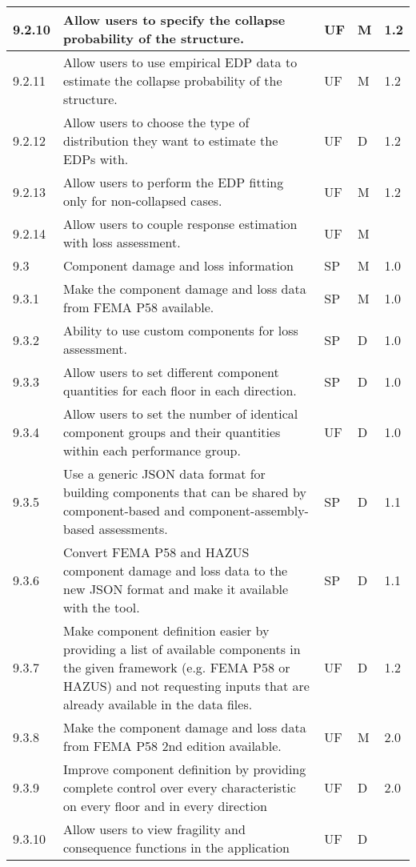 \begin{longtable}{| p{} | p{} | p{} | p{} |  p{} |}
9.2.10 & Allow users to specify the collapse probability of the structure. & UF & M & 1.2\\ \hline
9.2.11 & Allow users to use empirical EDP data to estimate the collapse probability of the structure. & UF & M & 1.2\\ \hline
9.2.12 & Allow users to choose the type of distribution they want to estimate the EDPs with. & UF & D & 1.2\\ \hline
9.2.13 & Allow users to perform the EDP fitting only for non-collapsed cases. & UF & M & 1.2\\ \hline
9.2.14 & Allow users to couple response estimation with loss assessment. & UF & M & \\ \hline
9.3 & Component damage and loss information & SP & M & 1.0\\ \hline
9.3.1 & Make the component damage and loss data from FEMA P58 available. & SP & M & 1.0 \\ \hline
9.3.2 & Ability to use custom components for loss assessment. & SP & D & 1.0 \\ \hline
9.3.3 & Allow users to set different component quantities for each floor in each direction. & SP & D & 1.0 \\ \hline
9.3.4 & Allow users to set the number of identical component groups and their quantities within each performance group. & UF & D & 1.0 \\ \hline
9.3.5 & Use a generic JSON data format for building components that can be shared by component-based and component-assembly-based assessments. & SP & D & 1.1 \\ \hline
9.3.6 & Convert FEMA P58 and HAZUS component damage and loss data to the new JSON format and make it available with the tool. & SP & D & 1.1 \\ \hline
9.3.7 & Make component definition easier by providing a list of available components in the given framework (e.g. FEMA P58 or HAZUS) and not requesting inputs that are already available in the data files. & UF & D & 1.2 \\ \hline
9.3.8 & Make the component damage and loss data from FEMA P58 2nd edition available. & UF & M & 2.0 \\ \hline
9.3.9 & Improve component definition by providing complete control over every characteristic on every floor and in every direction & UF & D & 2.0 \\ \hline
9.3.10 & Allow users to view fragility and consequence functions in the application & UF & D &  \\ \hline

\end{longtable}
